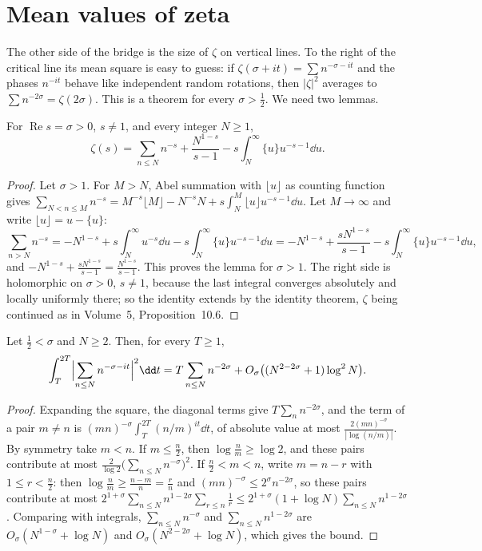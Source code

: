 \section{Mean values of zeta}

The other side of the bridge is the size of $\zeta$ on vertical lines. To the right of the critical line its mean square is easy to guess: if
$\zeta(\sigma+it)=\sum n^{-\sigma-it}$ and the phases $n^{-it}$ behave like independent random rotations, then $|\zeta|^2$ averages to
$\sum n^{-2\sigma}=\zeta(2\sigma)$. This is a theorem for every $\sigma>\frac12$. We need two lemmas.

\begin{lemma}\label{moments:lem:zetaapprox}
For $\operatorname{Re}s=\sigma>0$, $s\ne1$, and every integer $N\ge1$,
\[
\zeta(s)=\sum_{n\le N}n^{-s}+\frac{N^{1-s}}{s-1}-s\int_N^\infty\{u\}u^{-s-1}\dd u.
\]
\end{lemma}
\begin{proof}
Let $\sigma>1$. For $M>N$, Abel summation with $\lfloor u\rfloor$ as counting function gives
$\sum_{N<n\le M}n^{-s}=M^{-s}\lfloor M\rfloor-N^{-s}N+s\int_N^M\lfloor u\rfloor u^{-s-1}\dd u$. Let $M\to\infty$ and write $\lfloor u\rfloor=u-\{u\}$:
\[
\sum_{n>N}n^{-s}=-N^{1-s}+s\int_N^\infty u^{-s}\dd u-s\int_N^\infty\{u\}u^{-s-1}\dd u=-N^{1-s}+\frac{sN^{1-s}}{s-1}-s\int_N^\infty\{u\}u^{-s-1}\dd u,
\]
and $-N^{1-s}+\frac{sN^{1-s}}{s-1}=\frac{N^{1-s}}{s-1}$. This proves the lemma for $\sigma>1$. The right side is holomorphic on $\sigma>0$, $s\ne1$, because the last
integral converges absolutely and locally uniformly there; so the identity extends by the identity theorem, $\zeta$ being continued as in Volume~5,
Proposition~10.6.
\end{proof}

\begin{lemma}\label{moments:lem:dirmeanvalue}
Let $\frac12<\sigma$ and $N\ge2$. Then, for every $T\ge1$,
\[
\int_T^{2T}\Bigl|\sum_{n\le N}n^{-\sigma-it}\Bigr|^2\dd t=T\sum_{n\le N}n^{-2\sigma}+O_\sigma\bigl((N^{2-2\sigma}+1)\log^2N\bigr).
\]
\end{lemma}
\begin{proof}
Expanding the square, the diagonal terms give $T\sum_nn^{-2\sigma}$, and the term of a pair $m\ne n$ is $(mn)^{-\sigma}\int_T^{2T}(n/m)^{it}\dd t$, of absolute value at
most $\frac{2(mn)^{-\sigma}}{|\log(n/m)|}$. By symmetry take $m<n$. If $m\le\frac n2$, then $\log\frac nm\ge\log2$, and these pairs contribute at most
$\frac2{\log2}\bigl(\sum_{n\le N}n^{-\sigma}\bigr)^2$. If $\frac n2<m<n$, write $m=n-r$ with $1\le r<\frac n2$: then $\log\frac nm\ge\frac{n-m}n=\frac rn$ and
$(mn)^{-\sigma}\le2^\sigma n^{-2\sigma}$, so these pairs contribute at most $2^{1+\sigma}\sum_{n\le N}n^{1-2\sigma}\sum_{r\le n}\frac1r\le2^{1+\sigma}(1+\log N)\sum_{n\le N}n^{1-2\sigma}$.
Comparing with integrals, $\sum_{n\le N}n^{-\sigma}$ and $\sum_{n\le N}n^{1-2\sigma}$ are $O_\sigma(N^{1-\sigma}+\log N)$ and $O_\sigma(N^{2-2\sigma}+\log N)$, which gives the bound.
\end{proof}

